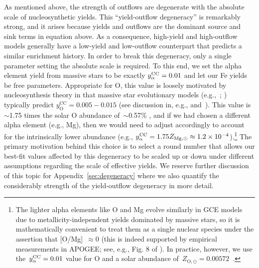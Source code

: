 \documentclass[ms.tex]{subfiles}
\begin{document}
\par
As mentioned above, the strength of outflows are degenerate with the absolute
scale of nucleosynthetic yields.
This ``yield-outflow degeneracy'' is remarkably strong, and it arises because
yields and outflows are the dominant source and sink terms in equation
 above.
As a consequence, high-yield and high-outflow models generally have a
low-yield and low-outflow counterpart that predicts a similar enrichment
history.
In order to break this degeneracy, only a single parameter setting the absolute
scale is required.
To this end, we set the alpha element yield from massive stars to be exactly
$y_\alpha^\text{CC} = 0.01$ and let our Fe yields be free parameters.
Appropriate for O, this value is loosely motivated by nucleosynthesis theory in
that massive star evolutionary models (e.g.,~\citealp*{Nomoto2013};
\citealp{Sukhbold2016, Limongi2018}) typically predict
$y_\text{O}^\text{CC} = 0.005 - 0.015$ (see discussion in, e.g.,
\citealp{Weinberg2017} and~\citealp{Johnson2020}).
This value is~$\sim$1.75 times the solar O abundance of~$\sim$0.57\%
\citep{Asplund2009}, and if we had chosen a different alpha element (e.g., Mg),
then we would need to adjust accordingly to account for the intrinsically lower
abundance (e.g., $y_\alpha^\text{CC} = 1.75 Z_{\text{Mg},\odot} \approx
1.2\times10^{-4}$).\footnote{
	The lighter alpha elements like O and Mg evolve similarly in GCE models due
	to metallicity-independent yields dominated by massive stars, so it is
	mathematically convenient to treat them as a single nuclear species
	under the assertion that [O/Mg]~$\approx 0$ (this is indeed supported by
	empirical measurements in APOGEE; see, e.g., Fig. 8 of
	\citealt{Weinberg2019}).
	In practice, however, we use the~$y_\alpha^\text{CC} = 0.01$ value for O and a solar
	abundance of~$Z_{\text{O},\odot} = 0.00572$~\citep{Asplund2009}.
}
The primary motivation behind this choice is to select a round number that
allows our best-fit values affected by this degeneracy to be scaled up or down
under different assumptions regarding the scale of effective yields.
We reserve further discussion of this topic for Appendix~\ref{sec:degeneracy}
where we also quantify the considerably strength of the yield-outflow
degeneracy in more detail.
\end{document}
